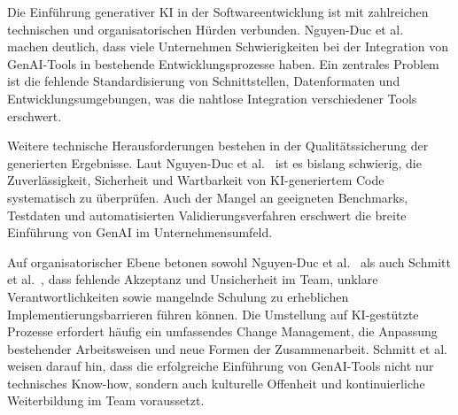 Die Einführung generativer KI in der Softwareentwicklung ist mit zahlreichen
technischen und organisatorischen Hürden verbunden. Nguyen-Duc et
al.~\cite{nguyen-duc_generative_2023} machen deutlich, dass viele Unternehmen
Schwierigkeiten bei der Integration von GenAI-Tools in bestehende
Entwicklungsprozesse haben. Ein zentrales Problem ist die fehlende
Standardisierung von Schnittstellen, Datenformaten und Entwicklungsumgebungen,
was die nahtlose Integration verschiedener Tools erschwert.

Weitere technische Herausforderungen bestehen in der Qualitätssicherung der
generierten Ergebnisse. Laut Nguyen-Duc et
al.~\cite{nguyen-duc_generative_2023} ist es bislang schwierig, die
Zuverlässigkeit, Sicherheit und Wartbarkeit von KI-generiertem Code
systematisch zu überprüfen. Auch der Mangel an geeigneten Benchmarks, Testdaten
und automatisierten Validierungsverfahren erschwert die breite Einführung von
GenAI im Unternehmensumfeld.

Auf organisatorischer Ebene betonen sowohl Nguyen-Duc et
al.~\cite{nguyen-duc_generative_2023} als auch Schmitt et
al.~\cite{schmitt_generative_2024}, dass fehlende Akzeptanz und Unsicherheit im
Team, unklare Verantwortlichkeiten sowie mangelnde Schulung zu erheblichen
Implementierungsbarrieren führen können. Die Umstellung auf KI-gestützte
Prozesse erfordert häufig ein umfassendes Change Management, die Anpassung
bestehender Arbeitsweisen und neue Formen der Zusammenarbeit. Schmitt et
al.~\cite{schmitt_generative_2024} weisen darauf hin, dass die erfolgreiche
Einführung von GenAI-Tools nicht nur technisches Know-how, sondern auch
kulturelle Offenheit und kontinuierliche Weiterbildung im Team voraussetzt.
